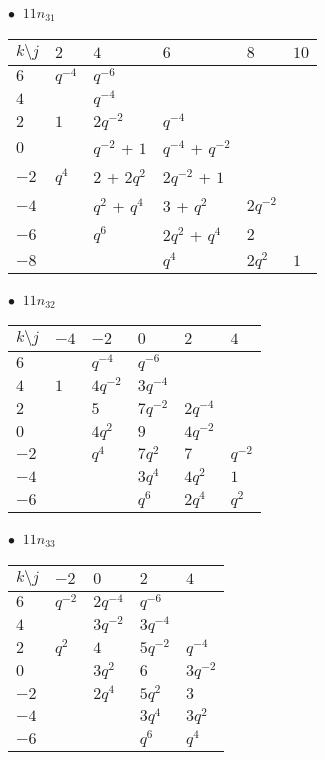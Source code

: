 \begin{minipage}{\linewidth}
$\bullet\ $ $11n_{31}$ \vspace{0.5em} \\
\begin{tabular}{l|lllll}
$k \setminus j$ & $2$ & $4$ & $6$ & $8$ & $10$ \\
\hline
$6$ & $q^{-4}$ & $q^{-6}$ &  &  &  \\
$4$ &  & $q^{-4}$ &  &  &  \\
$2$ & $1$ & $2q^{-2}$ & $q^{-4}$ &  &  \\
$0$ &  & $q^{-2}$ + $1$ & $q^{-4}$ + $q^{-2}$ &  &  \\
$-2$ & $q^{4}$ & $2$ + $2q^{2}$ & $2q^{-2}$ + $1$ &  &  \\
$-4$ &  & $q^{2}$ + $q^{4}$ & $3$ + $q^{2}$ & $2q^{-2}$ &  \\
$-6$ &  & $q^{6}$ & $2q^{2}$ + $q^{4}$ & $2$ &  \\
$-8$ &  &  & $q^{4}$ & $2q^{2}$ & $1$ \\
\end{tabular}
\vspace{2em}
\end{minipage}
%
\begin{minipage}{\linewidth}
$\bullet\ $ $11n_{32}$ \vspace{0.5em} \\
\begin{tabular}{l|lllll}
$k \setminus j$ & $-4$ & $-2$ & $0$ & $2$ & $4$ \\
\hline
$6$ &  & $q^{-4}$ & $q^{-6}$ &  &  \\
$4$ & $1$ & $4q^{-2}$ & $3q^{-4}$ &  &  \\
$2$ &  & $5$ & $7q^{-2}$ & $2q^{-4}$ &  \\
$0$ &  & $4q^{2}$ & $9$ & $4q^{-2}$ &  \\
$-2$ &  & $q^{4}$ & $7q^{2}$ & $7$ & $q^{-2}$ \\
$-4$ &  &  & $3q^{4}$ & $4q^{2}$ & $1$ \\
$-6$ &  &  & $q^{6}$ & $2q^{4}$ & $q^{2}$ \\
\end{tabular}
\vspace{2em}
\end{minipage}
%
\begin{minipage}{\linewidth}
$\bullet\ $ $11n_{33}$ \vspace{0.5em} \\
\begin{tabular}{l|llll}
$k \setminus j$ & $-2$ & $0$ & $2$ & $4$ \\
\hline
$6$ & $q^{-2}$ & $2q^{-4}$ & $q^{-6}$ &  \\
$4$ &  & $3q^{-2}$ & $3q^{-4}$ &  \\
$2$ & $q^{2}$ & $4$ & $5q^{-2}$ & $q^{-4}$ \\
$0$ &  & $3q^{2}$ & $6$ & $3q^{-2}$ \\
$-2$ &  & $2q^{4}$ & $5q^{2}$ & $3$ \\
$-4$ &  &  & $3q^{4}$ & $3q^{2}$ \\
$-6$ &  &  & $q^{6}$ & $q^{4}$ \\
\end{tabular}
\vspace{2em}
\end{minipage}
